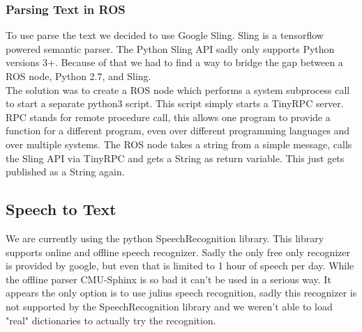 \documentclass[main.tex]{subfiles}
\begin{document}
		\subsubsection{Parsing Text in ROS}
		To use parse the text we decided to use Google Sling. Sling is a tensorflow powered semantic parser. The Python Sling API sadly only supports Python versions 3+. Because of that we had to find a way to bridge the gap between a ROS node, Python 2.7, and Sling.\\
		The solution was to create a ROS node which performs a system subprocess call to start a separate python3 script. This script simply starts a TinyRPC server. RPC stands for remote procedure call, this allows one program to provide a function for a different program, even over different programming languages and over multiple systems. The ROS node takes a string from a simple message, calls the Sling API via TinyRPC and gets a String as return variable. This just gets published as a String again.
		
		\subsection{Speech to Text}
		We are currently using the python SpeechRecognition library. This library supports online and offline speech recognizer. Sadly the only free only recognizer is provided by google, but even that is limited to 1 hour of speech per day. While the offline parser CMU-Sphinx is so bad it can't be used in a serious way.
		It appears the only option is to use julius speech recognition, sadly this recognizer is not supported by the SpeechRecognition library and we weren't able to load "real" dictionaries to actually try the recognition.
	
\end{document}
